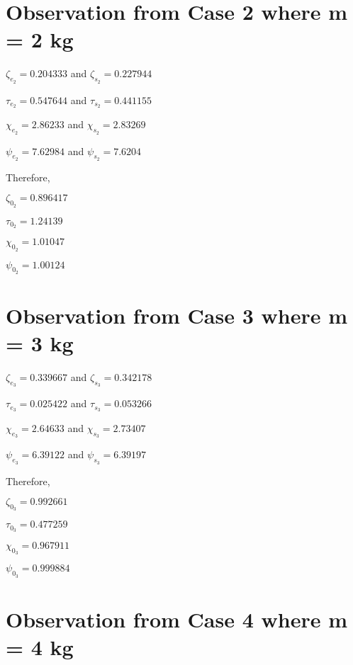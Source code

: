         
        
\section{{Observation from Case 2 where m = 2 kg}}
        
    {$\zeta_{e_2} = 0.204333$ and $\zeta_{s_2} = 0.227944$}
            
    {$\tau_{e_2} = 0.547644$ and $\tau_{s_2} = 0.441155$}
            
    {$\chi_{e_2} = 2.86233$ and $\chi_{s_2} = 2.83269$}
            
    {$\psi_{e_2} = 7.62984$ and $\psi_{s_2} = 7.6204$}
            
    {Therefore,}
            
    $\zeta_{0_2} = 0.896417$
            
    $\tau_{0_2} = 1.24139$
            
    $\chi_{0_2} = 1.01047$
            
    $\psi_{0_2} = 1.00124$    
            
        
        
\section{{Observation from Case 3 where m = 3 kg}}
        
    {$\zeta_{e_3} = 0.339667$ and $\zeta_{s_3} = 0.342178$}
            
    {$\tau_{e_3} = 0.025422$ and $\tau_{s_3} = 0.053266$}
            
    {$\chi_{e_3} = 2.64633$ and $\chi_{s_3} = 2.73407$}
            
    {$\psi_{e_3} = 6.39122$ and $\psi_{s_3} = 6.39197$}
            
    {Therefore,}
            
    $\zeta_{0_3} = 0.992661$
            
    $\tau_{0_3} = 0.477259$
            
    $\chi_{0_3} = 0.967911$
            
    $\psi_{0_3} = 0.999884$    
            
        
        
\section{{Observation from Case 4 where m = 4 kg}}
        
